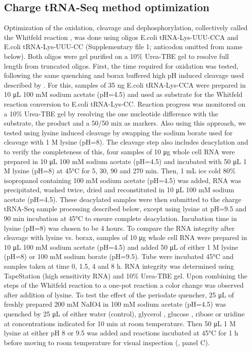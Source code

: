 \documentclass[9pt,lineno]{elife}
\begin{document}
\subsection{Charge tRNA-Seq method optimization}
Optimization of the oxidation, cleavage and dephosphorylation, collectively called the Whitfeld reaction \cite{Whitfeld1953-ca}, was done using oligos E.coli tRNA-Lys-UUU-CCA and E.coli tRNA-Lys-UUU-CC (Supplementary file 1; anticodon omitted from name below).
Both oligos were gel purified on a 10\% Urea-TBE gel to resolve full length from truncated oligos.
First, the time required for oxidation was tested, following the same quenching and borax buffered high pH induced cleavage used described by \cite{Evans2017-st}.
For this, samples of 35 ng E.coli tRNA-Lys-CCA were prepared in 10 μL 100 mM sodium acetate (pH=4.5) and used as substrate for the Whitfeld reaction conversion to E.coli tRNA-Lys-CC.
Reaction progress was monitored on a 10\% Urea-TBE gel by resolving the one nucleotide difference with the substrate, the product and a 50/50 mix as markers.
Also using this approach, we tested using lysine induced cleavage \citep{Khym1961-xf} by swapping the sodium borate used for cleavage with 1 M lysine (pH=8).
The cleavage step also includes deacylation and to verify the completeness of this, four samples of 10 μg whole cell RNA were prepared in 10 μL 100 mM sodium acetate (pH=4.5) and incubated with 50 μL 1 M lysine (pH=8) at 45°C for 5, 30, 90 and 270 min.
Then, 1 mL ice cold 80\% isopropanol containing 100 mM sodium acetate (pH=4.5) was added, RNA was precipitated, washed twice, dried and reconstituted in 10 μL 100 mM sodium acetate (pH=4.5).
These deacylated samples were then submitted to the charge tRNA-Seq sample processing described below, except using lysine at pH=9.5 and 90 min incubation at 45°C to ensure complete deacylation.
Incubation time in lysine (pH=8) was chosen to be 4 hours.
To compare the RNA integrity after cleavage with lysine vs. borax, samples of 10 μg whole cell RNA were prepared in 10 μL 100 mM sodium acetate (pH=4.5) and added 50 μL of either 1 M lysine (pH=8) or 100 mM sodium borate (pH=9.5).
Tube were incubated 45°C and samples taken at time 0, 1.5, 4 and 8 h.
RNA integrity was determined using TapeStation (high sensitivity RNA) and 10\% Urea-TBE gel.
Upon combining the steps of the Whitfeld reaction to a one-pot reaction a color change was observed after addition of lysine.
To test the effect of the periodate quencher, 25 μL of freshly prepared 200 mM NaIO4 in 100 mM sodium acetate (pH=4.5) was quenched by 25 μL of either water (control), glycerol \citep{Alefelder1998-ln}, glucose \citep{Evans2017-st}, ribose \citep{Watkins2022-er} or uridine at concentrations indicated for 10 min at room temperature.
Then 50 μL 1 M lysine at either pH 8 or 9.5 was added and reactions incubated at 45°C for 1 h before moving to room temperature for visual inspection (, panel C).
\end{document}
